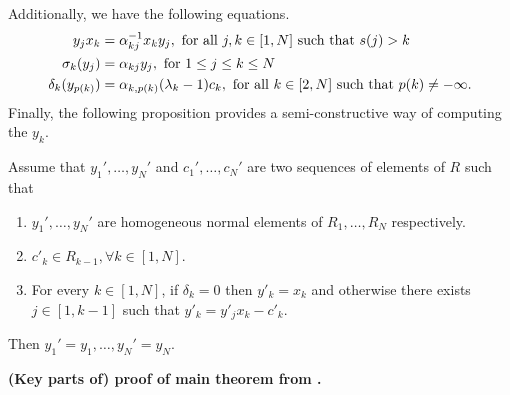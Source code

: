 \documentclass{article}
\begin{document}
Additionally, we have the following equations.
\begin{align}\label{eq:y_x_quasi_commute}
	y_j x_k            & = \alpha_{kj}^{-1} x_k y_j, \text{ for all } j, k \in [1, N] \text{ such that } s(j) > k                                             \\
	\sigma_k (y_j)     & = \alpha_{kj}y_j, \text{ for } 1 \leq j \leq k \leq N \label{eq:sigma_of_y}                                                         \\
	\delta_k(y_{p(k)}) & = \alpha_{k, p(k)}(\lambda_k - 1)c_k, \text{ for all } k \in [2, N] \text{ such that } p(k) \neq - \infty \label{eq:delta_of_y_pk}.
\end{align}
%
Finally, the following proposition provides a semi-constructive way of computing the
$y_k$.
\begin{proposition}
	Assume that $y_1', \dots, y_N'$ and $c_1',\dots, c_N'$ are two sequences of elements of $R$ such that
	\begin{enumerate}
		\item $y_1', \dots, y_N'$ are homogeneous normal elements of $R_1, \dots, R_N$ respectively.
		\item $c'_k \in R_{k-1}, \forall k \in [1, N]$.
		\item For every $k \in [1, N]$, if $\delta_k = 0$ then $y'_k = x_k$ and otherwise there
		      exists $j \in [1, k-1]$ such that $y'_k = y'_j x_k - c'_k$.
	\end{enumerate}
	Then $y_1' = y_1, \dots, y_N' = y_N$.
\end{proposition}

\textbf{(Key parts of) proof of main theorem from \cite{GoodearlYakimov2017QCA}.}
\end{document}
